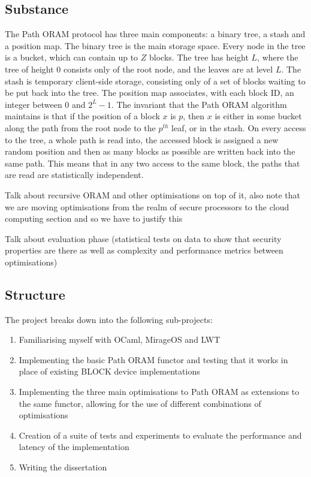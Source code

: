 \documentclass[12pt,a4paper,twoside]{article}
\begin{document}
\subsection*{Substance}

The Path ORAM protocol has three main components: a binary tree, a stash and a position map. The binary tree is the main storage space. Every node in the tree is a bucket, which can contain up to $Z$ blocks. The tree has height $L$, where the tree of height 0 consists only of the root node, and the leaves are at level $L$. The stash is temporary client-side storage, consisting only of a set of blocks waiting to be put back into the tree. The position map associates, with each block ID, an integer between 0 and $2^L-1$. The invariant that the Path ORAM algorithm maintains is that if the position of a block $x$ is $p$, then $x$ is either in some bucket along the path from the root node to the $p^{th}$ leaf, or in the stash. On every access to the tree, a whole path is read into, the accessed block is assigned a new random position and then as many blocks as possible are written back into the same path. This means that in any two access to the same block, the paths that are read are statistically independent.

Talk about recursive ORAM and other optimisations on top of it, also note that we are moving optimisations from the realm of secure processors to the cloud computing section and so we have to justify this

Talk about evaluation phase (statistical tests on data to show that security properties are there as well as complexity and performance metrics between optimisations)

\subsection*{Structure}

The project breaks down into the following sub-projects:

\begin{enumerate}

\item Familiarising myself with OCaml, MirageOS and LWT

\item Implementing the basic Path ORAM functor and testing that it works in place of existing BLOCK device implementations

\item Implementing the three main optimisations to Path ORAM as extensions to the same functor, allowing for the use of different combinations of optimisations

\item Creation of a suite of tests and experiments to evaluate the performance and latency of the implementation

\item Writing the dissertation

\end{enumerate}
\end{document}
